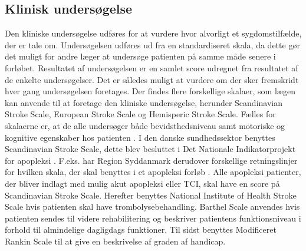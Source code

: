 \subsection{Klinisk undersøgelse}
Den kliniske undersøgelse udføres for at vurdere hvor alvorligt et sygdomstilfælde, der er tale om. Undersøgelsen udføres ud fra en standardiseret skala, da dette gør det muligt for andre læger at undersøge patienten på samme måde senere i forløbet. Resultatet af undersøgelsen er en samlet score udregnet fra resultatet af de enkelte undersøgelser. Det er således muligt at vurdere om der sker fremskridt hver gang undersøgelsen foretages. \citep{Sundhedsstyrelsen2009}
Der findes flere forskellige skalaer, som lægen kan anvende til at foretage den kliniske undersøgelse, herunder Scandinavian Stroke Scale, European Stroke Scale og Hemisperic Stroke Scale. Fælles for skalaerne er, at de alle undersøger både bevidsthedsniveau samt motoriske og kognitive egenskaber hos patienten \citep{Center, Centera, Centerb, Centerc}. I den danske sundhedssektor benyttes Scandinavian Stroke Scale, dette blev besluttet i Det Nationale Indikatorprojekt for apopleksi \citep{Apopleksi2009}. F.eks. har Region Syddanmark derudover forskellige retningslinjer for hvilken skala, der skal benyttes i et apopleksi forløb \citep{Syddanmark}. Alle apopleksi patienter, der bliver indlagt med mulig akut apopleksi eller TCI, skal have en score på Scandinavian Stroke Scale. Herefter benyttes National Institute of Health Stroke Scale hvis patienten skal have trombolysebehandling. Barthel Scale anvendes hvis patienten sendes til videre rehabilitering og beskriver patientens funktionsniveau i forhold til almindelige dagligdags funktioner. Til sidst benyttes Modificeret Rankin Scale til at give en beskrivelse af graden af handicap. \citep{Syddanmark}

